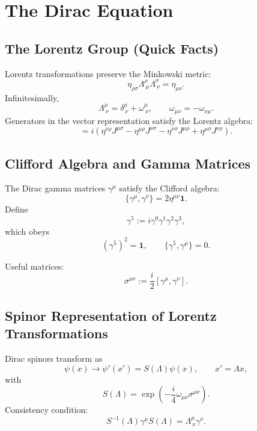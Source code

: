 \section{The Dirac Equation}

\subsection{The Lorentz Group (Quick Facts)}
Lorentz transformations preserve the Minkowski metric:
\begin{equation}
\eta_{\rho\sigma}\Lambda^\rho_{\ \mu}\Lambda^\sigma_{\ \nu}=\eta_{\mu\nu}.
\end{equation}
Infinitesimally,
\begin{equation}
\Lambda^\mu_{\ \nu}=\delta^\mu_{\ \nu}+\omega^\mu_{\ \nu}, 
\qquad \omega_{\mu\nu}=-\omega_{\nu\mu}.
\end{equation}
Generators in the vector representation satisfy the Lorentz algebra:
\begin{equation}
[J^{\mu\nu},J^{\rho\sigma}]
=
i\left(
\eta^{\nu\rho}J^{\mu\sigma}
-\eta^{\mu\rho}J^{\nu\sigma}
-\eta^{\nu\sigma}J^{\mu\rho}
+\eta^{\mu\sigma}J^{\nu\rho}
\right).
\end{equation}

\subsection{Clifford Algebra and Gamma Matrices}
The Dirac gamma matrices $\gamma^\mu$ satisfy the Clifford algebra:
\begin{equation}
\{\gamma^\mu,\gamma^\nu\}=2\eta^{\mu\nu}\mathbf{1}.
\end{equation}
Define
\begin{equation}
\gamma^5 := i\gamma^0\gamma^1\gamma^2\gamma^3,
\end{equation}
which obeys
\begin{equation}
(\gamma^5)^2=\mathbf{1}, 
\qquad
\{\gamma^5,\gamma^\mu\}=0.
\end{equation}

Useful matrices:
\begin{equation}
\sigma^{\mu\nu}:=\frac{i}{2}[\gamma^\mu,\gamma^\nu].
\end{equation}

\subsection{Spinor Representation of Lorentz Transformations}
Dirac spinors transform as
\begin{equation}
\psi(x)\to \psi'(x') = S(\Lambda)\psi(x),
\qquad x'=\Lambda x,
\end{equation}
with
\begin{equation}
S(\Lambda)=\exp\left(-\frac{i}{4}\omega_{\mu\nu}\sigma^{\mu\nu}\right).
\end{equation}
Consistency condition:
\begin{equation}
S^{-1}(\Lambda)\gamma^\mu S(\Lambda)=\Lambda^\mu_{\ \nu}\gamma^\nu.
\end{equation}

